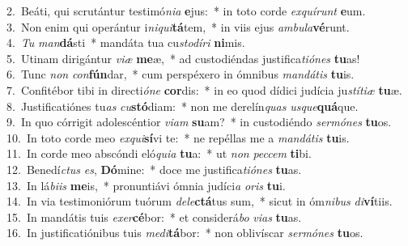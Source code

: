 {2.~}Beáti, qui scrutántur testimó\textit{ni}\textit{a} \textbf{e}jus:~* in toto corde \textit{ex}\textit{quí}\textit{runt} \textbf{e}um.\\
{3.~}Non enim qui operántur i\textit{ni}\textit{qui}\textbf{tá}tem,~* in viis ejus \textit{am}\textit{bu}\textit{la}\textbf{vé}runt.\\
{4.~}\textit{Tu} \textit{man}\textbf{dá}sti~* mandáta tua cu\textit{sto}\textit{dí}\textit{ri} \textbf{ni}mis.\\
{5.~}Utinam dirigántur \textit{vi}\textit{æ} \textbf{me}æ,~* ad custodiéndas justifica\textit{ti}\textit{ó}\textit{nes} \textbf{tu}as!\\
{6.~}Tunc \textit{non} \textit{con}\textbf{fún}dar,~* cum perspéxero in ómnibus \textit{man}\textit{dá}\textit{tis} \textbf{tu}is.\\
{7.~}Confitébor tibi in directi\textit{ó}\textit{ne} \textbf{cor}dis:~* in eo quod dídici judícia ju\textit{stí}\textit{ti}\textit{æ} \textbf{tu}æ.\\
{8.~}Justificatiónes tu\textit{as} \textit{cu}\textbf{stó}diam:~* non me derelín\textit{quas} \textit{us}\textit{que}\textbf{quá}que.\\
{9.~}In quo córrigit adolescéntior \textit{vi}\textit{am} \textbf{su}am?~* in custodiéndo \textit{ser}\textit{mó}\textit{nes} \textbf{tu}os.\\
{10.~}In toto corde meo \textit{ex}\textit{qui}\textbf{sí}vi te:~* ne repéllas me a \textit{man}\textit{dá}\textit{tis} \textbf{tu}is.\\
{11.~}In corde meo abscóndi eló\textit{qui}\textit{a} \textbf{tu}a:~* ut \textit{non} \textit{pec}\textit{cem} \textbf{ti}bi.\\
{12.~}Benedí\textit{ctus} \textit{es}, \textbf{Dó}mine:~* doce me justifica\textit{ti}\textit{ó}\textit{nes} \textbf{tu}as.\\
{13.~}In lá\textit{bi}\textit{is} \textbf{me}is,~* pronuntiávi ómnia judíci\textit{a} \textit{o}\textit{ris} \textbf{tu}i.\\
{14.~}In via testimoniórum tuórum \textit{de}\textit{le}\textbf{ctá}tus sum,~* sicut in óm\textit{ni}\textit{bus} \textit{di}\textbf{ví}tiis.\\
{15.~}In mandátis tuis \textit{e}\textit{xer}\textbf{cé}bor:~* et considerá\textit{bo} \textit{vi}\textit{as} \textbf{tu}as.\\
{16.~}In justificatiónibus tuis \textit{me}\textit{di}\textbf{tá}bor:~* non oblivíscar \textit{ser}\textit{mó}\textit{nes} \textbf{tu}os.\\
